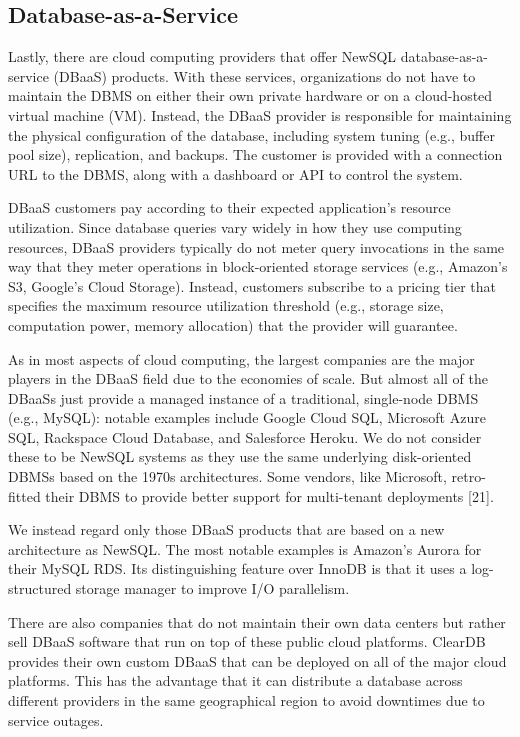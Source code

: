 \documentclass[a4paper,11pt,twoside,openright]{article}
\begin{document}
\hypertarget{database-as-a-service}{%
\subsection{Database-as-a-Service}\label{database-as-a-service}}

Lastly, there are cloud computing providers that offer NewSQL
database-as-a-service (DBaaS) products. With these services,
organizations do not have to maintain the DBMS on either their own
private hardware or on a cloud-hosted virtual machine (VM). Instead, the
DBaaS provider is responsible for maintaining the physical configuration
of the database, including system tuning (e.g., buffer pool size),
replication, and backups. The customer is provided with a connection URL
to the DBMS, along with a dashboard or API to control the system.

DBaaS customers pay according to their expected application's resource
utilization. Since database queries vary widely in how they use
computing resources, DBaaS providers typically do not meter query
invocations in the same way that they meter operations in block-oriented
storage services (e.g., Amazon's S3, Google's Cloud Storage). Instead,
customers subscribe to a pricing tier that specifies the maximum
resource utilization threshold (e.g., storage size, computation power,
memory allocation) that the provider will guarantee.

As in most aspects of cloud computing, the largest companies are the
major players in the DBaaS field due to the economies of scale. But
almost all of the DBaaSs just provide a managed instance of a
traditional, single-node DBMS (e.g., MySQL): notable examples include
Google Cloud SQL, Microsoft Azure SQL, Rackspace Cloud Database, and
Salesforce Heroku. We do not consider these to be NewSQL systems as they
use the same underlying disk-oriented DBMSs based on the 1970s
architectures. Some vendors, like Microsoft, retro-fitted their DBMS to
provide better support for multi-tenant deployments {[}21{]}.

We instead regard only those DBaaS products that are based on a new
architecture as NewSQL. The most notable examples is Amazon's Aurora for
their MySQL RDS. Its distinguishing feature over InnoDB is that it uses
a log-structured storage manager to improve I/O parallelism.

There are also companies that do not maintain their own data centers but
rather sell DBaaS software that run on top of these public cloud
platforms. ClearDB provides their own custom DBaaS that can be deployed
on all of the major cloud platforms. This has the advantage that it can
distribute a database across different providers in the same
geographical region to avoid downtimes due to service outages.
\end{document}
